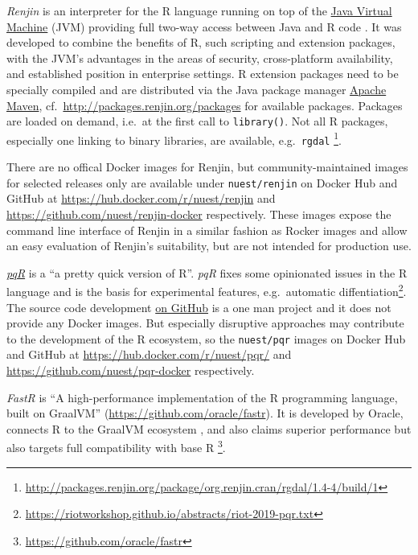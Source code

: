 \emph{Renjin} is an interpreter for the R language running on top of the
\href{https://en.wikipedia.org/wiki/Java_virtual_machine}{Java Virtual
Machine} (JVM) providing full two-way access between Java and R code
\citep{wikipedia_renjin_2018}. It was developed to combine the benefits
of R, such scripting and extension packages, with the JVM's advantages
in the areas of security, cross-platform availability, and established
position in enterprise settings. R extension packages need to be
specially compiled and are distributed via the Java package manager
\href{https://en.wikipedia.org/wiki/Apache_Maven}{Apache Maven},
cf.~\url{http://packages.renjin.org/packages} for available packages.
Packages are loaded on demand, i.e.~at the first call to
\texttt{library()}. Not all R packages, especially one linking to binary
libraries, are available, e.g.~\texttt{rgdal}
\footnote{\href{http://packages.renjin.org/package/org.renjin.cran/rgdal/1.4-4/build/1}{http://packages.renjin.org/package/org.renjin.cran/rgdal/1.4-4/build/1}}.

There are no offical Docker images for Renjin, but community-maintained
images for selected releases only are available under
\texttt{nuest/renjin} on Docker Hub and GitHub at
\url{https://hub.docker.com/r/nuest/renjin} and
\url{https://github.com/nuest/renjin-docker} respectively. These images
expose the command line interface of Renjin in a similar fashion as
Rocker images and allow an easy evaluation of Renjin's suitability, but
are not intended for production use.

\href{http://www.pqr-project.org/}{\emph{pqR}} is a ``a pretty quick
version of R''. \emph{pqR} fixes some opinionated issues in the R
language and is the basis for experimental features, e.g.~automatic
diffentiation\footnote{ \href{https://riotworkshop.github.io/abstracts/riot-2019-pqr.txt}{https://riotworkshop.github.io/abstracts/riot-2019-pqr.txt}}.
The source code development
\href{https://github.com/radfordneal/pqR/}{on GitHub} is a one man
project and it does not provide any Docker images. But especially
disruptive approaches may contribute to the development of the R
ecosystem, so the \texttt{nuest/pqr} images on Docker Hub and GitHub at
\url{https://hub.docker.com/r/nuest/pqr/} and
\url{https://github.com/nuest/pqr-docker} respectively.

\emph{FastR} is ``A high-performance implementation of the R programming
language, built on GraalVM'' (\url{https://github.com/oracle/fastr}). It
is developed by Oracle, connects R to the GraalVM ecosystem
\citep{wikipedia_graalvm_2019}, and also claims superior performance but
also targets full compatibility with base R
\footnote{ \href{https://github.com/oracle/fastr}{https://github.com/oracle/fastr}}.

